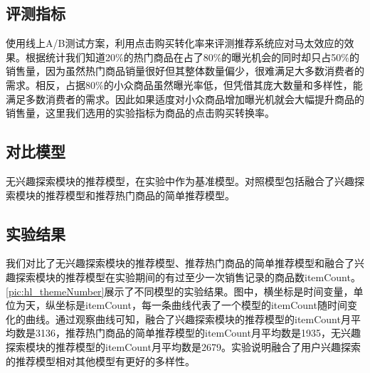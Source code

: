   \subsection{评测指标}
  使用线上A/B测试方案，利用点击购买转化率来评测推荐系统应对马太效应的效果。根据统计我们知道20\%的热门商品在占了80\%的曝光机会的同时却只占50\%的销售量，因为虽然热门商品销量很好但其整体数量偏少，很难满足大多数消费者的需求。相反，占据80\%的小众商品虽然曝光率低，但凭借其庞大数量和多样性，能满足多数消费者的需求。因此如果适度对小众商品增加曝光机就会大幅提升商品的销售量，这里我们选用的实验指标为商品的点击购买转换率。
  \subsection{对比模型}
  无兴趣探索模块的推荐模型，在实验中作为基准模型。对照模型包括融合了兴趣探索模块的推荐模型和推荐热门商品的简单推荐模型。
  \subsection{实验结果}
  我们对比了无兴趣探索模块的推荐模型、推荐热门商品的简单推荐模型和融合了兴趣探索模块的推荐模型在实验期间的有过至少一次销售记录的商品数itemCount。\autoref{pic:hl_themeNumber}展示了不同模型的实验结果。图中，横坐标是时间变量，单位为天，纵坐标是itemCount，每一条曲线代表了一个模型的itemCount随时间变化的曲线。通过观察曲线可知，融合了兴趣探索模块的推荐模型的itemCount月平均数是3136，推荐热门商品的简单推荐模型的itemCount月平均数是1935，无兴趣探索模块的推荐模型的itemCount月平均数是2679。实验说明融合了用户兴趣探索的推荐模型相对其他模型有更好的多样性。
  \begin{figure}
  \centering
    \label{pic:hl_themeNumber}
  \end{figure}

